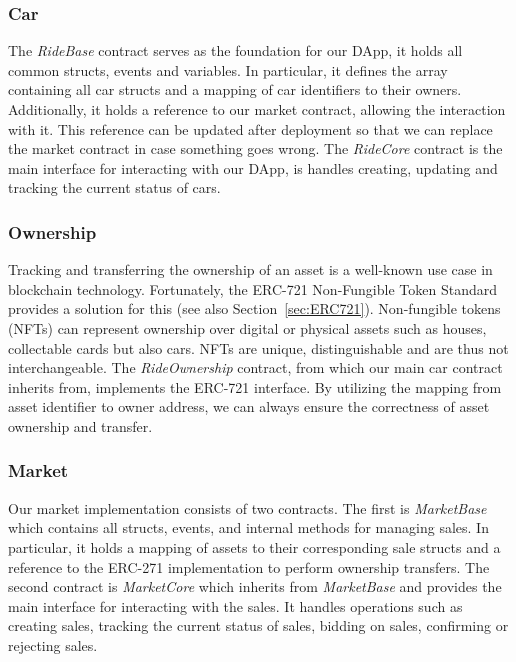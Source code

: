\subsubsection{Car}
The \textit{RideBase} contract serves as the foundation for our DApp, it holds all common structs, events and variables. In particular, it defines the array containing all car structs and a mapping of car identifiers to their owners. Additionally, it holds a reference to our market contract, allowing the interaction with it. This reference can be updated after deployment so that we can replace the market contract in case something goes wrong. The \textit{RideCore} contract is the main interface for interacting with our DApp, is handles creating, updating and tracking the current status of cars.

\subsubsection{Ownership}
Tracking and transferring the ownership of an asset is a well-known use case in blockchain technology. Fortunately, the ERC-721 Non-Fungible Token Standard~\cite{ERC721Summary} provides a solution for this (see also Section~\ref{sec:ERC721}). Non-fungible tokens (NFTs) can represent ownership over digital or physical assets such as houses, collectable cards but also cars. NFTs are unique, distinguishable and are thus not interchangeable. The \textit{RideOwnership} contract, from which our main car contract inherits from, implements the ERC-721 interface. By utilizing the mapping from asset identifier to owner address, we can always ensure the correctness of asset ownership and transfer.

\subsubsection{Market}
Our market implementation consists of two contracts. The first is \textit{MarketBase} which contains all structs, events, and internal methods for managing sales. In particular, it holds a mapping of assets to their corresponding sale structs and a reference to the ERC-271 implementation to perform ownership transfers. The second contract is \textit{MarketCore} which inherits from \textit{MarketBase} and provides the main interface for interacting with the sales. It handles operations such as creating sales, tracking the current status of sales, bidding on sales, confirming or rejecting sales.

